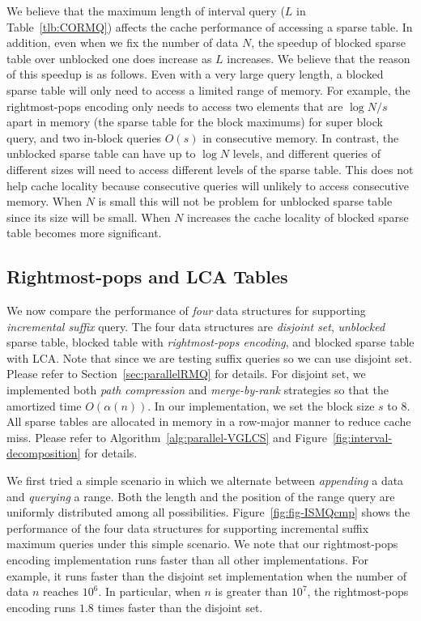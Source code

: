 We believe that the maximum length of interval query ($L$ in
Table~\ref{tlb:CORMQ}) affects the cache performance of accessing a
sparse table.  In addition, even when we fix the number of data $N$, the
speedup of blocked sparse table over unblocked one does increase as $L$
increases.  We believe that the reason of this speedup is as follows.
Even with a very large query length, a blocked sparse table will only
need to access a limited range of memory.  For example, the
rightmost-pops encoding only needs to access two elements that are $\log
{N/s}$ apart in memory (the sparse table for the block maximums) for
super block query, and two in-block queries $O(s)$ in consecutive
memory.  In contrast, the unblocked sparse table can have up to $\log N$
levels, and different queries of different sizes will need to access
different levels of the sparse table.  This does not help cache locality
because consecutive queries will unlikely to access consecutive memory.
When $N$ is small this will not be problem for unblocked sparse table
since its size will be small.  When $N$ increases the cache locality of
blocked sparse table becomes more significant.




\subsection{Rightmost-pops and LCA Tables}

We now compare the performance of {\em four} data structures for
supporting {\em incremental suffix} query.  The four data structures are
{\em disjoint set}, {\em unblocked} sparse table, blocked table with
{\em rightmost-pops encoding}, and blocked sparse table with LCA. Note
that since we are testing suffix queries so we can use disjoint set.
Please refer to Section~\ref{sec:parallelRMQ} for details. For disjoint
set, we implemented both {\em path compression} and {\em merge-by-rank}
strategies so that the amortized time $O(\alpha(n))$. In our
implementation, we set the block size $s$ to $8$.  All sparse tables are
allocated in memory in a row-major manner to reduce cache miss.  Please
refer to Algorithm~\ref{alg:parallel-VGLCS} and
Figure~\ref{fig:interval-decomposition} for details.


We first tried a simple scenario in which we alternate between {\em
appending} a data and {\em querying} a range.  Both the length and the
position of the range query are uniformly distributed among all
possibilities.  Figure~\ref{fig:fig-ISMQcmp} shows the performance of
the four data structures for supporting incremental suffix maximum
queries under this simple scenario.  We note that our rightmost-pops
encoding implementation runs faster than all other implementations. For
example, it runs faster than the disjoint set implementation when the
number of data $n$ reaches $10^6$.  In particular, when $n$ is greater
than $10^7$, the rightmost-pops encoding runs $1.8$ times faster than
the disjoint set.


